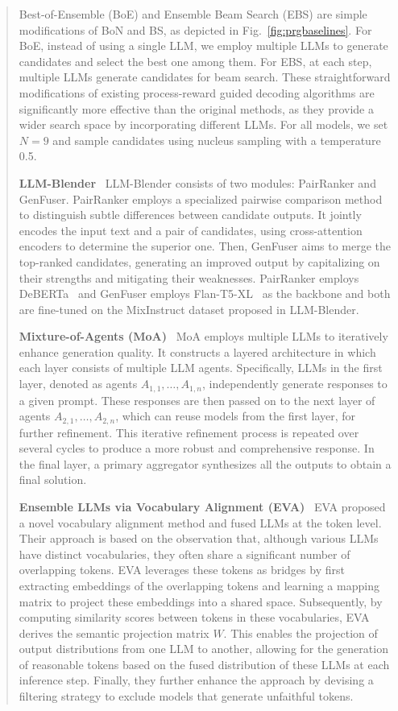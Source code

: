 \documentclass[11pt]{article}
\begin{document}
\begin{abstract}
Best-of-Ensemble (BoE) and Ensemble Beam Search (EBS) are simple modifications of BoN and BS, as depicted in Fig.~\ref{fig:prgbaselines}. 
For BoE, instead of using a single LLM, we employ multiple LLMs to generate candidates and select the best one among them. 
For EBS, at each step, multiple LLMs generate candidates for beam search. 
These straightforward modifications of existing process-reward guided decoding algorithms are significantly more effective than the original methods, as they provide a wider search space by incorporating different LLMs.
For all models, we set \( N=9 \) and sample candidates using nucleus sampling with a temperature 0.5.
\medskip
\par \noindent \textbf{LLM-Blender}~\cite{jiang-etal-2023-llm} \; 
LLM-Blender consists of two modules: PairRanker and GenFuser. 
PairRanker employs a specialized pairwise comparison method to distinguish subtle differences between candidate outputs. 
It jointly encodes the input text and a pair of candidates, using cross-attention encoders to determine the superior one. 
Then, GenFuser aims to merge the top-ranked candidates, generating an improved
output by capitalizing on their strengths and mitigating their weaknesses.
PairRanker employs DeBERTa~\citep{he-etal-2021-deberta} and GenFuser employs Flan-T5-XL~\citep{chung-etal-2022-flan} as the backbone and both are fine-tuned on the MixInstruct dataset proposed in LLM-Blender.
\medskip
\par \noindent \textbf{Mixture-of-Agents (MoA)}~\cite{wu-etal-2024-mixture} \; 
MoA employs multiple LLMs to iteratively enhance generation quality. 
It constructs a layered architecture in which each layer consists of multiple LLM agents. 
Specifically, LLMs in the first layer, denoted as agents \( A_{1,1}, \dots, A_{1,n} \), independently generate responses to a given prompt. 
These responses are then passed on to the next layer of agents \( A_{2,1}, \dots, A_{2,n} \), which can reuse models from the first layer, for further refinement.
This iterative refinement process is repeated over several cycles to produce a more robust and comprehensive response. 
In the final layer, a primary aggregator synthesizes all the outputs to obtain a final solution.
\medskip
\par \noindent \textbf{Ensemble LLMs via Vocabulary Alignment (EVA)}~\cite{xu-etal-2024-bridging} \; 
EVA proposed a novel vocabulary alignment method and fused LLMs at the token level. 
Their approach is based on the observation that, although various LLMs have distinct vocabularies, they often share a significant number of overlapping tokens. 
EVA leverages these tokens as bridges by first extracting embeddings of the overlapping tokens and learning a mapping matrix to project these embeddings into a shared space. 
Subsequently, by computing similarity scores between tokens in these vocabularies, EVA derives the semantic projection matrix \( W \). 
This enables the projection of output distributions from one LLM to another, allowing for the generation of reasonable tokens based on the fused distribution of these LLMs at each inference step. 
Finally, they further enhance the approach by devising a filtering strategy to exclude models that generate unfaithful tokens.


\end{abstract}
\end{document}

